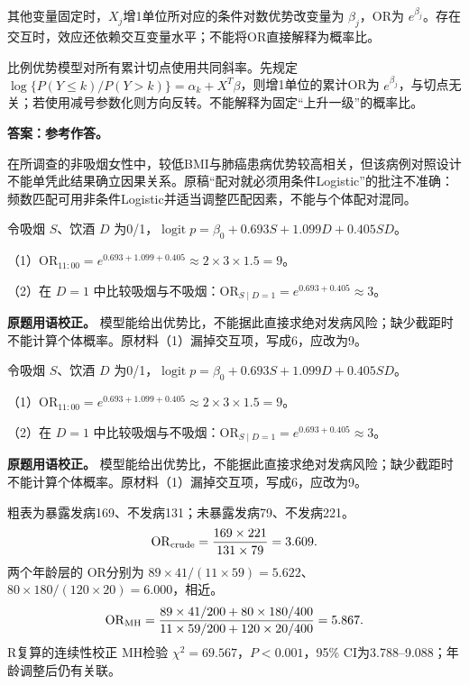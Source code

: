 
其他变量固定时，\(X_j\)增1单位所对应的条件对数优势改变量为 \(\beta_j\)，OR为 \(e^{\beta_j}\)。存在交互时，效应还依赖交互变量水平；不能将OR直接解释为概率比。



比例优势模型对所有累计切点使用共同斜率。先规定 \(\log\{P(Y\le k)/P(Y>k)\}=\alpha_k+X^T\beta\)，则增1单位的累计OR为 \(e^{\beta_j}\)，与切点无关；若使用减号参数化则方向反转。不能解释为固定``上升一级''的概率比。



\textbf{答案：参考作答。}

在所调查的非吸烟女性中，较低BMI与肺癌患病优势较高相关，但该病例对照设计不能单凭此结果确立因果关系。原稿``配对就必须用条件Logistic''的批注不准确：频数匹配可用非条件Logistic并适当调整匹配因素，不能与个体配对混同。



令吸烟 \(S\)、饮酒 \(D\) 为0/1，\(\operatorname{logit}p=\beta_0+0.693S+1.099D+0.405SD\)。

（1）\(\mathrm{OR}_{11:00}=e^{0.693+1.099+0.405}\approx2\times3\times1.5=9\)。

（2）在 \(D=1\) 中比较吸烟与不吸烟：\(\mathrm{OR}_{S\mid D=1}=e^{0.693+0.405}\approx3\)。

\textbf{原题用语校正。} 模型能给出优势比，不能据此直接求绝对发病风险；缺少截距时不能计算个体概率。原材料（1）漏掉交互项，写成6，应改为9。



令吸烟 \(S\)、饮酒 \(D\) 为0/1，\(\operatorname{logit}p=\beta_0+0.693S+1.099D+0.405SD\)。

（1）\(\mathrm{OR}_{11:00}=e^{0.693+1.099+0.405}\approx2\times3\times1.5=9\)。

（2）在 \(D=1\) 中比较吸烟与不吸烟：\(\mathrm{OR}_{S\mid D=1}=e^{0.693+0.405}\approx3\)。

\textbf{原题用语校正。} 模型能给出优势比，不能据此直接求绝对发病风险；缺少截距时不能计算个体概率。原材料（1）漏掉交互项，写成6，应改为9。



粗表为暴露发病169、不发病131；未暴露发病79、不发病221。 \[\mathrm{OR}_{\rm crude}=\frac{169\times221}{131\times79}=3.609.\] 两个年龄层的 OR分别为 \(89\times41/(11\times59)=5.622\)、\(80\times180/(120\times20)=6.000\)，相近。 \[\mathrm{OR}_{\rm MH}=\frac{89\times41/200+80\times180/400}{11\times59/200+120\times20/400}=5.867.\] R复算的连续性校正 MH检验 \(\chi^2=69.567\)，\(P<0.001\)，95\% CI为3.788--9.088；年龄调整后仍有关联。

